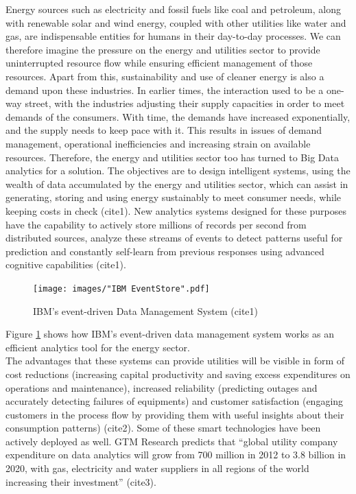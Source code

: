 Energy sources such as electricity and fossil fuels like coal and petroleum, along with renewable solar and wind energy, coupled with other utilities like water and gas, are indispensable entities for humans in their day-to-day processes. We can therefore imagine the pressure on the energy and utilities sector to provide uninterrupted resource flow while ensuring efficient management of those resources. Apart from this, sustainability and use of cleaner energy is also a demand upon these industries. In earlier times, the interaction used to be a one-way street, with the industries adjusting their supply capacities in order to meet demands of the consumers. With time, the demands have increased exponentially, and the supply needs to keep pace with it. This results in issues of demand management, operational inefficiencies and increasing strain on available resources. Therefore, the energy and utilities sector too has turned to Big Data analytics for a solution. The objectives are to design intelligent systems, using the wealth of data accumulated by the energy and utilities sector, which can assist in generating, storing and using energy sustainably to meet consumer needs, while keeping costs in check (cite1). New analytics systems designed for these purposes have the capability to actively store millions of records per second from  distributed sources, analyze these streams of events to detect patterns useful for prediction and constantly self-learn from previous responses using advanced cognitive capabilities (cite1).
\begin{figure}
	\texttt{[image: images/"IBM EventStore".pdf]}
	\caption{IBM's event-driven Data Management System (cite1)}
	\label{F:event}
\end{figure}
Figure \ref{F:event} shows how IBM's event-driven data management system works as an efficient analytics tool for the energy sector.\\
The advantages that these systems can provide utilities will be visible in form of cost reductions (increasing capital productivity and saving excess expenditures on operations and maintenance), increased reliability (predicting outages and accurately detecting failures of equipments) and customer satisfaction (engaging customers in the process flow by providing them with useful insights about their consumption patterns) (cite2). Some of these smart technologies have been actively deployed as well. GTM Research predicts that ``global utility company expenditure on data analytics will grow from 700 million in 2012 to 3.8 billion in 2020, with gas, electricity and water suppliers in all regions of the world increasing their investment'' (cite3).
   

